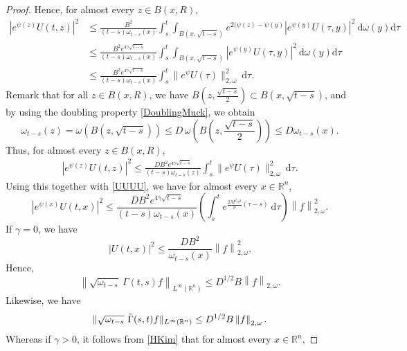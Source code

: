 \documentclass[12pt, letterpaper]{amsart}
\theoremstyle{definition}
\theoremstyle{remark}
\numberwithin{equation}{section}
\begin{document}
\begin{proof}
Hence, for almost every $z \in B(x,R)$,
\begin{align*}
     |e^{\psi(z)} U(t,z) |^2 &\leq \frac{B^2}{(t-s)\omega_{t-s}(x)}\int_{s}^{t}
\int_{B(x,\sqrt{t-s})}e^{2(\psi(z)-\psi(y)}  | e^{\psi(y)}U(\tau,y)  |^2\ \mathrm d\omega(y)  \mathrm d\tau
\\ & \leq \frac{B^2 e^{4\gamma \sqrt{t-s}}}{(t-s)\omega_{t-s}(x)} \int_{s}^{t}
\int_{B(x,\sqrt{t-s})} | e^{\psi(y)}U(\tau,y) |^2\ \mathrm d\omega(y) \mathrm d \tau
\\ & \leq \frac{B^2 e^{4\gamma \sqrt{t-s}}}{(t-s)\omega_{t-s}(x)} \int_{s}^{t} \|e^{\psi}U(\tau)   \|^2_{2,\omega} \ \mathrm d\tau.
\end{align*}
Remark that for all $z \in B(x,R)$, we have $B(z,\frac{\sqrt{t-s}}{2}) \subset B(x,\sqrt{t-s})$, and by using the doubling property \eqref{DoublingMuck}, we obtain
\begin{equation*}
\omega_{t-s}(z)=\omega( B(z,\sqrt{t-s})) \le D \, \omega(B(z,\frac{\sqrt{t-s}}{2})) \le D \omega_{t-s}(x).
\end{equation*}
Thus, for almost every $z \in B(x,R)$,
\begin{align*}
     |e^{\psi(z)} U(t,z) |^2  \leq \frac{DB^2 e^{4\gamma \sqrt{t-s}}}{(t-s)\omega_{t-s}(z)} \int_{s}^{t} \|e^{\psi}U(\tau)   \|^2_{2,\omega} \ \mathrm d\tau.
\end{align*}
Using this together with \eqref{UUUU}, we have for almost every $x \in \mathbb{R}^n$,
\begin{equation}\label{HKim}
     |e^{\psi(x)} U(t,x)  |^2  \leq \frac{DB^2 e^{4\gamma \sqrt{t-s}}}{(t-s)\omega_{t-s}(x)}  \left ( \int_{s}^{t} e^{\frac{2M^2\gamma^2}{\nu}(\tau-s)}\ \mathrm d\tau \right ) \left \|f  \right \|^2_{2,\omega}.
\end{equation}
If $\gamma=0$, we have 
\begin{equation*}
    \left | U(t,x) \right |^2  \leq \frac{DB^2}{\omega_{t-s}(x)} \left \|f  \right \|^2_{2,\omega}.
\end{equation*}
Hence, 
\begin{equation}\label{0Gamma}
   \left \| \sqrt{\omega_{t-s}}\ \Gamma (t,s)f \right \|_{L^\infty(\mathbb{R}^n)}\leq D^{1/2}B  \left \|f  \right \|_{2,\omega}.
\end{equation}
Likewise, we have
\begin{equation}\label{00Gamma}
    \| \sqrt{\omega_{t-s}} \ \Tilde{\Gamma}(s,t)f  \|_{L^\infty(\mathbb{R}^n)}\leq D^{1/2} B  \left \|f  \right \|_{2,\omega}.
\end{equation}
Whereas if $\gamma>0$, it follows from \eqref{HKim} that for almost every $x \in \mathbb{R}^n$,

\end{proof}
\end{document}
